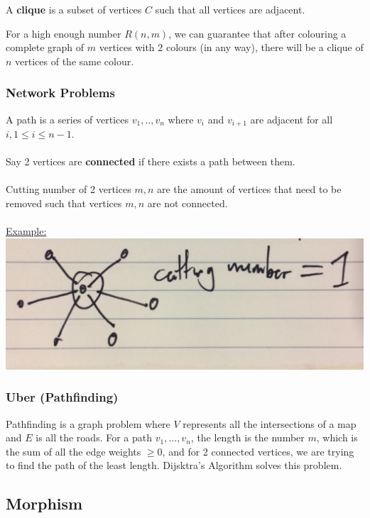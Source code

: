 \documentclass[12pt]{article}
\begin{document}
A \textbf{clique} is a subset of vertices $C$ such that all vertices are adjacent.

\begin{tcolorbox}[title=Theorem: Ramsey's theorem]
	For a high enough number $R(n,m)$, we can guarantee that after colouring a complete graph of $m$ vertices with $2$ colours (in any way), there will be a clique of $n$ vertices of the same colour.
\end{tcolorbox}

\subsubsection{Network Problems}

A path is a series of vertices $v_1, .., v_n$ where $v_i$ and $v_{i+1}$ are adjacent for all $i, 1 \leq i \leq n-1$.\\
\\
Say 2 vertices are \textbf{connected} if there exists a path between them.\\
\\
Cutting number of 2 vertices $m,n$ are the amount of vertices that need to be removed such that vertices $m,n$ are not connected.
\\
\\
\underline{Example:}\\
\includegraphics[scale=0.125]{lec2-3}

\subsubsection{Uber (Pathfinding)}

Pathfinding is a graph problem where $V$ represents all the intersections of a map and $E$ is all the roads. For a path $v_1, ... ,v_n$, the length is the number $m$, which is the sum of all the edge weights $\geq 0$, and for 2 connected vertices, we are trying to find the path of the least length. Dijsktra's Algorithm solves this problem.

\subsection{Morphism}
\end{document}
